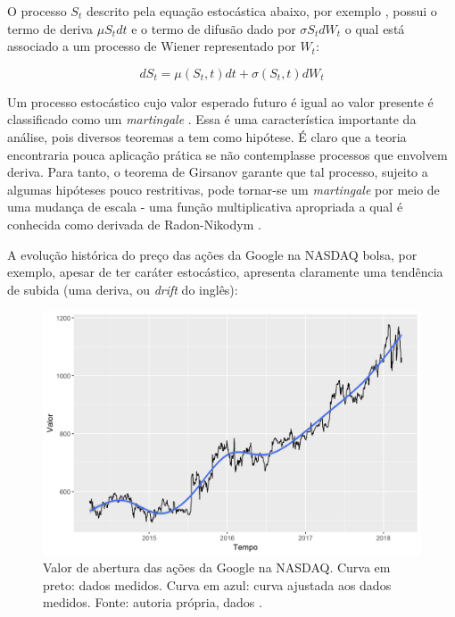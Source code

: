 \documentclass[
	12pt,				%
	openright,			%
	oneside,			%
	a4paper,			%
	english,			%
	french,				%
	spanish,			%
	brazil				%
	]{abntex2}
\begin{document}
O processo $S_t$ descrito pela equação estocástica abaixo, por exemplo \cite{art27}, possui o termo de deriva $\mu S_t dt$ e o termo de difusão dado por $\sigma S_t dW_t$ o qual está associado a um processo de Wiener representado por $W_t$:

\begin{equation}
dS_t = \mu(S_t,t) dt + \sigma(S_t,t) dW_t
\end{equation}


Um processo estocástico cujo valor esperado futuro é igual ao valor presente é classificado como um \textit{martingale} \cite{stevens}. Essa é uma característica importante da análise, pois diversos teoremas a tem como hipótese. É claro que a teoria encontraria pouca aplicação prática se não contemplasse processos que envolvem deriva. Para tanto, o teorema de Girsanov \cite{stevens} garante que tal processo, sujeito a algumas hipóteses pouco restritivas, pode tornar-se um \textit{martingale} por meio de uma mudança de escala - uma função multiplicativa apropriada a qual é conhecida como derivada de Radon-Nikodym \cite{stevens}.

\newpage
A evolução histórica do preço das ações da Google na NASDAQ bolsa, por exemplo, apesar de ter caráter estocástico, apresenta claramente uma tendência de subida (uma deriva, ou \textit{drift} do inglês):

\begin{figure}[h]
    \centering
	\includegraphics[width=\textwidth]{stock}
	\caption{Valor de abertura das ações da Google na NASDAQ. Curva em preto: dados medidos. Curva em azul: curva ajustada aos dados medidos. Fonte: autoria própria, dados \cite{nasdaq}.}
\end{figure}
\FloatBarrier
\end{document}
